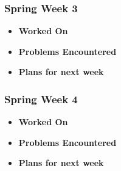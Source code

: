 \documentclass[compsoc,draftclsnofoot,onecolumn,10pt]{IEEEtran}
\begin{document}
\subsubsection{Spring Week 3}
\begin{itemize}
    \item {\textbf{Worked On}}
    \begin{itemize}
        
    \end{itemize}

    \item {\textbf{Problems Encountered}}
    \begin{itemize}
        
    \end{itemize}

    \item{\textbf{Plans for next week}}
    \begin{itemize}
        
    \end{itemize}

\end{itemize}

\subsubsection{Spring Week 4}
\begin{itemize}
    \item {\textbf{Worked On}}
    \begin{itemize}
        
    \end{itemize}

    \item {\textbf{Problems Encountered}}
    \begin{itemize}
        
    \end{itemize}

    \item{\textbf{Plans for next week}}
    \begin{itemize}
        
    \end{itemize}

\end{itemize}
\end{document}
